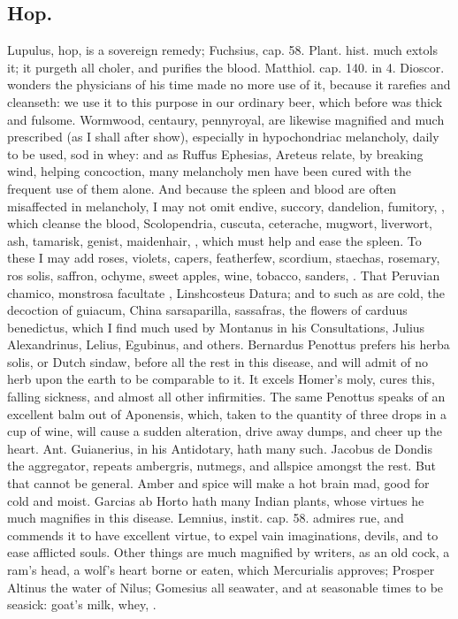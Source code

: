 {\subsection{Hop.}
Lupulus, hop, is a sovereign remedy; Fuchsius, cap. 58. Plant.
hist. much extols it; it purgeth all choler, and purifies the
blood. Matthiol. cap. 140. in 4. Dioscor. wonders the physicians of his
time made no more use of it, because it rarefies and cleanseth: we use
it to this purpose in our ordinary beer, which before was thick and
fulsome.
Wormwood, centaury, pennyroyal, are likewise magnified and much
prescribed (as I shall after show), especially in hypochondriac
melancholy, daily to be used, sod in whey: and as Ruffus Ephesias,
Areteus relate, by breaking wind, helping concoction, many
melancholy men have been cured with the frequent use of them alone.
And because the spleen and blood are often misaffected in melancholy, I
may not omit endive, succory, dandelion, fumitory, \etc{}, which cleanse
the blood, Scolopendria, cuscuta, ceterache, mugwort, liverwort, ash,
tamarisk, genist, maidenhair, \etc{}, which must help and ease the spleen.
To these I may add roses, violets, capers, featherfew, scordium,
staechas, rosemary, ros solis, saffron, ochyme, sweet apples, wine,
tobacco, sanders, \etc{}. That Peruvian chamico, monstrosa facultate \etc{},
Linshcosteus Datura; and to such as are cold, the decoction of
guiacum, China sarsaparilla, sassafras, the flowers of carduus
benedictus, which I find much used by Montanus in his Consultations,
Julius Alexandrinus, Lelius, Egubinus, and others. Bernardus
Penottus prefers his herba solis, or Dutch sindaw, before all the rest
in this disease, and will admit of no herb upon the earth to be
comparable to it. It excels Homer's moly, cures this, falling sickness,
and almost all other infirmities. The same Penottus speaks of an
excellent balm out of Aponensis, which, taken to the quantity of three
drops in a cup of wine, will cause a sudden alteration, drive
away dumps, and cheer up the heart. Ant. Guianerius, in his Antidotary,
hath many such. Jacobus de Dondis the aggregator, repeats
ambergris, nutmegs, and allspice amongst the rest. But that cannot be
general. Amber and spice will make a hot brain mad, good for cold and
moist. Garcias ab Horto hath many Indian plants, whose virtues he much
magnifies in this disease. Lemnius, instit. cap. 58. admires rue, and
commends it to have excellent virtue, to expel vain imaginations,
devils, and to ease afflicted souls. Other things are much magnified
by writers, as an old cock, a ram's head, a wolf's heart borne or
eaten, which Mercurialis approves; Prosper Altinus the water of Nilus;
Gomesius all seawater, and at seasonable times to be seasick: goat's
milk, whey, \etc{}.

}
